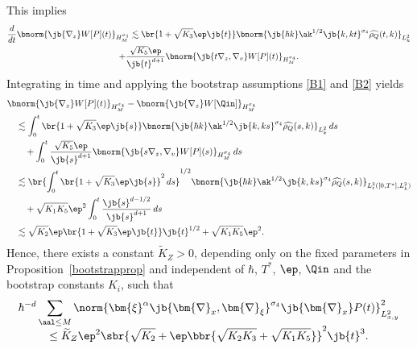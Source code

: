 \pagebreak[2]\noindent
This implies
\begin{multline*}
\frac{d}{dt}\bnorm{\jb{\nabla_z}W[P](t)}_{H^{\sigma_4}_M}\lesssim\br{1+\sqrt{K_3}\ep\jb{t}}\bnorm{\jb{\hbar k}\ak^{1/2}\jb{k,kt}^{\sigma_4}\widehat{\rho_Q}(t,k)}_{L^2_{k}}\\
+\frac{\sqrt{K_5}\ep}{\jb{t}^{d+1}}\bnorm{\jb{t\nabla_z,\nabla_v}W[P](t)}_{H^{\sigma_4}_M}.
\end{multline*}
Integrating in time and applying the bootstrap assumptions \eqref{B1} and \eqref{B2} yields
\begin{align*}
&\bnorm{\jb{\nabla_z}W[P](t)}_{H^{\sigma_4}_M}-\bnorm{\jb{\nabla_z}W[\Qin]}_{H^{\sigma_4}_M}\\
&\quad\lesssim\int_0^t\br{1+\sqrt{K_3}\ep\jb{s}}\bnorm{\jb{\hbar k}\ak^{1/2}\jb{k,ks}^{\sigma_4}\widehat{\rho_Q}(s,k)}_{L^2_{k}}\,ds\\
&\qquad+\int_0^t\frac{\sqrt{K_5}\ep}{\jb{s}^{d+1}}\bnorm{\jb{s\nabla_z,\nabla_v}W[P](s)}_{H^{\sigma_4}_M}\,ds\\
&\quad\lesssim\br{\int_0^t\br{1+\sqrt{K_3}\ep\jb{s}}^2\,ds}^{1/2}\bnorm{\jb{\hbar k}\ak^{1/2}\jb{k,ks}^{\sigma_4}\widehat{\rho_Q}(s,k)}_{L^2_{t}([0,T^*],L^2_k)}\\
&\qquad+\sqrt{K_1K_5}\ep^2\int_0^t\frac{\jb{s}^{d-1/2}}{\jb{s}^{d+1}}\,ds\\
&\quad\lesssim\sqrt{K_2}\ep\br{1+\sqrt{K_3}\ep\jb{t}}\jb{t}^{1/2}+\sqrt{K_1K_5}\ep^2.
\end{align*}
Hence, there exists a constant $\widetilde K_Z>0$, depending only on the fixed parameters in Proposition~\ref{bootstrapprop} and independent of $\hbar$, $T^*$, $\ep$, $\Qin$ and the bootstrap constants $K_i$, such that
\begin{multline}\label{B1zconc}
\hbar^{-d}\sum_{\aal\leq M}\norm{\bm{\xi}^\alpha\jb{\bm{\nabla}_x,\bm{\nabla}_\xi}^{\sigma_4}\jb{\bm{\nabla}_x}P(t)}_{L^2_{x,y}}^2\\[-5pt]
\leq\widetilde K_Z\ep^2\sbr{\sqrt{K_2}+\ep\bbr{\sqrt{K_2K_3}+\sqrt{K_1K_5}}}^2\jb{t}^{3}.
\end{multline}

